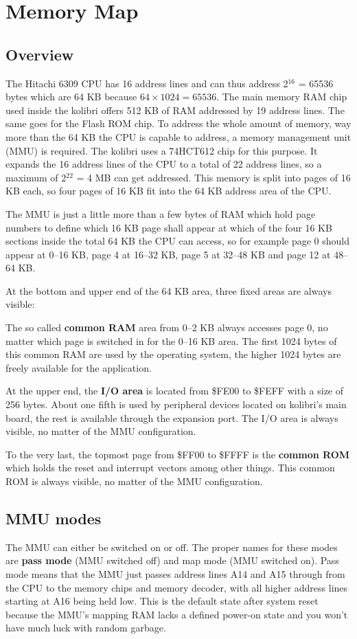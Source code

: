 \chapter{Memory Map}

\section{Overview}
The Hitachi 6309 CPU has 16 address lines and can thus address
2$^{16}$ = 65536 bytes which are 64 KB because $64 \times 1024 =
65536$.  The main memory RAM chip used inside the kolibri offers
512 KB of RAM addressed by 19 address lines. The same goes for
the Flash ROM chip. To address the whole amount of memory, way
more than the 64 KB the CPU is capable to address, a memory
management unit (MMU) is required. The kolibri uses a 74HCT612
chip for this purpose. It expands the 16 address lines of the
CPU to a total of 22 address lines, so a maximum of 2$^{22}$ = 4
MB can get addressed. This memory is split into pages of 16 KB
each, so four pages of 16 KB fit into the 64 KB address area of
the CPU.

The MMU is just a little more than a few bytes of RAM which hold
page numbers to define which 16 KB page shall appear at which of
the four 16 KB sections inside the total 64 KB the CPU can
access, so for example page 0 should appear at 0--16 KB, page 4
at 16--32 KB, page 5 at 32--48 KB and page 12 at 48--64 KB.

At the bottom and upper end of the 64 KB area, three fixed areas
are always visible:

The so called {\bf common RAM} area from 0--2 KB  always
accesses page 0, no matter which page is switched in for the
0--16 KB area.  The first 1024 bytes of this common RAM are used
by the operating system, the higher 1024 bytes are freely
available for the application.

At the upper end, the {\bf I/O area} is located from \$FE00 to
\$FEFF with a size of 256 bytes. About one fifth is used by
peripheral devices located on kolibri's main board, the rest is
available through the expansion port. The I/O area is always
visible, no matter of the MMU configuration.

To the very last, the topmost page from \$FF00 to \$FFFF is the
{\bf common ROM} which holds the reset and interrupt vectors
among other things. This common ROM is always visible, no matter
of the MMU configuration.

\section{MMU modes}
The MMU can either be switched on or off. The proper names for
these modes are {\bf pass mode} (MMU switched off) and map mode
(MMU switched on). Pass mode means that the MMU just passes
address lines A14 and A15 through from the CPU to the memory
chips and memory decoder, with all higher address lines starting
at A16 being held low. This is the default state after system
reset because the MMU's mapping RAM lacks a defined power-on
state and you won't have much luck with random garbage.

